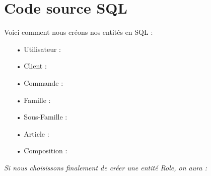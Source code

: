 \section{Code source SQL}

Voici comment nous créons nos entités en SQL :
\begin{enumerate}
\item[•] Utilisateur : \\

\item[•] Client : \\

\item[•] Commande : \\

\item[•] Famille : \\

\item[•] Sous-Famille : \\

\item[•] Article : \\

\item[•] Composition : \\

\end{enumerate}

\noindent
\textit{Si nous choisissons finalement de créer une entité Role, on aura :}\\
